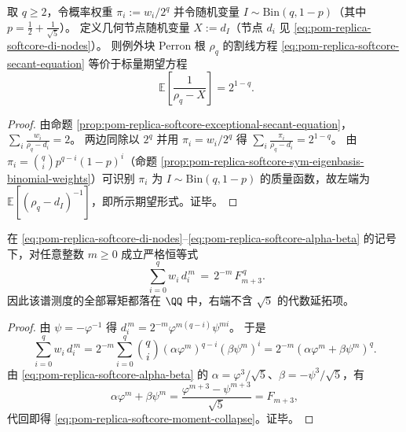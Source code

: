 \begin{corollary}[割线方程的期望形式]\label{cor:pom-replica-softcore-secant-equation-expectation-form}
取 \(q\ge 2\)，令概率权重 \(\pi_i:=w_i/2^q\) 并令随机变量 \(I\sim \mathrm{Bin}(q,1-p)\)（其中 \(p=\frac12+\frac{1}{\sqrt5}\)）。
定义几何节点随机变量 \(X:=d_I\)（节点 \(d_i\) 见 \eqref{eq:pom-replica-softcore-di-nodes}）。
则例外块 Perron 根 \(\rho_q\) 的割线方程 \eqref{eq:pom-replica-softcore-secant-equation} 等价于标量期望方程
\[
\boxed{\;
\mathbb E\!\left[\frac{1}{\rho_q-X}\right]=2^{1-q}.}
\]
\end{corollary}

\begin{proof}
由命题 \ref{prop:pom-replica-softcore-exceptional-secant-equation}，
\(
\sum_i \frac{w_i}{\rho_q-d_i}=2
\)。
两边同除以 \(2^q\) 并用 \(\pi_i=w_i/2^q\) 得
\(
\sum_i \frac{\pi_i}{\rho_q-d_i}=2^{1-q}
\)。
由 \(\pi_i=\binom{q}{i}p^{q-i}(1-p)^i\)（命题 \ref{prop:pom-replica-softcore-sym-eigenbasis-binomial-weights}）可识别 \(\pi_i\) 为 \(I\sim\mathrm{Bin}(q,1-p)\) 的质量函数，故左端为 \(\mathbb E[(\rho_q-d_I)^{-1}]\)，即所示期望形式。证毕。
\end{proof}

\begin{theorem}\label{thm:pom-replica-softcore-fibonacci-power-moment-collapse}
在 \eqref{eq:pom-replica-softcore-di-nodes}--\eqref{eq:pom-replica-softcore-alpha-beta} 的记号下，对任意整数 \(m\ge 0\) 成立严格恒等式
\begin{equation}\label{eq:pom-replica-softcore-moment-collapse}
\boxed{\;
\sum_{i=0}^{q} w_i\,d_i^{\,m}
\,=\,2^{-m}\,F_{m+3}^{\,q}.}
\end{equation}
因此该谱测度的全部幂矩都落在 \(\QQ\) 中，右端不含 \(\sqrt5\) 的代数延拓项。
\end{theorem}
\begin{proof}
由 \(\psi=-\varphi^{-1}\) 得 \(d_i^{\,m}=2^{-m}\varphi^{m(q-i)}\psi^{mi}\)。
于是
\[
\sum_{i=0}^{q} w_i\,d_i^{\,m}
=2^{-m}\sum_{i=0}^{q}\binom{q}{i}(\alpha\varphi^m)^{q-i}(\beta\psi^m)^i
=2^{-m}(\alpha\varphi^m+\beta\psi^m)^{q}.
\]
由 \eqref{eq:pom-replica-softcore-alpha-beta} 的 \(\alpha=\varphi^3/\sqrt5\)、\(\beta=-\psi^3/\sqrt5\)，有
\[
\alpha\varphi^m+\beta\psi^m=\frac{\varphi^{m+3}-\psi^{m+3}}{\sqrt5}=F_{m+3},
\]
代回即得 \eqref{eq:pom-replica-softcore-moment-collapse}。证毕。
\end{proof}

